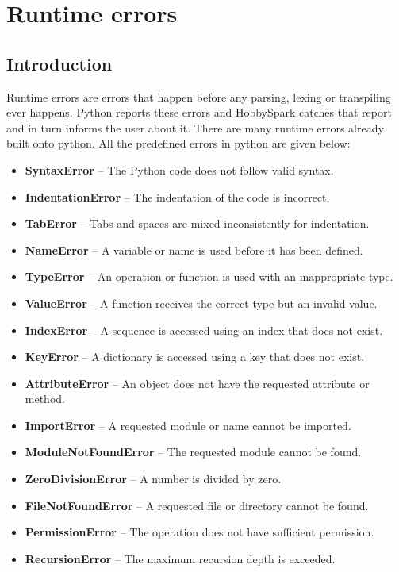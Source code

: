 \chapter{Runtime errors}
	\label{chap:run}
	\section{Introduction}
	Runtime errors are errors that happen before any parsing, lexing or transpiling ever happens. Python reports these errors and HobbySpark catches that report and in turn informs the user about it. There are many runtime errors already built onto python. All the predefined errors in python are given below: 
	\begin{itemize}
		\item \textbf{SyntaxError} -- The Python code does not follow valid syntax.
		\item \textbf{IndentationError} -- The indentation of the code is incorrect.
		\item \textbf{TabError} -- Tabs and spaces are mixed inconsistently for indentation.
		\item \textbf{NameError} -- A variable or name is used before it has been defined.
		\item \textbf{TypeError} -- An operation or function is used with an inappropriate type.
		\item \textbf{ValueError} -- A function receives the correct type but an invalid value.
		\item \textbf{IndexError} -- A sequence is accessed using an index that does not exist.
		\item \textbf{KeyError} -- A dictionary is accessed using a key that does not exist.
		\item \textbf{AttributeError} -- An object does not have the requested attribute or method.
		\item \textbf{ImportError} -- A requested module or name cannot be imported.
		\item \textbf{ModuleNotFoundError} -- The requested module cannot be found.
		\item \textbf{ZeroDivisionError} -- A number is divided by zero.
		\item \textbf{FileNotFoundError} -- A requested file or directory cannot be found.
		\item \textbf{PermissionError} -- The operation does not have sufficient permission.
		\item \textbf{RecursionError} -- The maximum recursion depth is exceeded.

\end{itemize}
